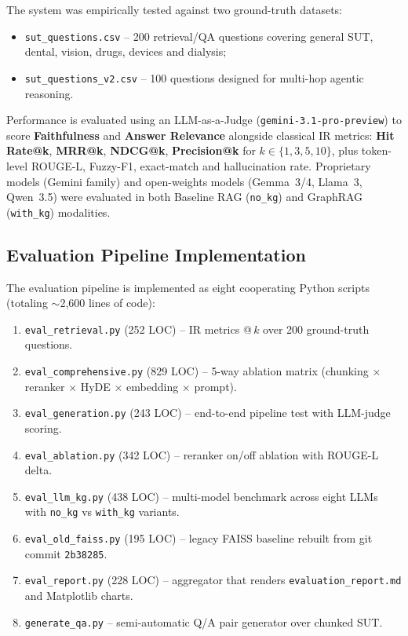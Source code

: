 \documentclass[11pt, a4paper]{article}
\begin{document}
The system was empirically tested against two ground-truth datasets:
\begin{itemize}[leftmargin=*]
    \item \texttt{sut\_questions.csv} -- 200 retrieval/QA questions covering general SUT, dental, vision, drugs, devices and dialysis;
    \item \texttt{sut\_questions\_v2.csv} -- 100 questions designed for multi-hop agentic reasoning.
\end{itemize}

Performance is evaluated using an LLM-as-a-Judge (\texttt{gemini-3.1-pro-preview}) to score \textbf{Faithfulness} and \textbf{Answer Relevance} alongside classical IR metrics: \textbf{Hit Rate@k}, \textbf{MRR@k}, \textbf{NDCG@k}, \textbf{Precision@k} for $k\!\in\!\{1,3,5,10\}$, plus token-level ROUGE-L, Fuzzy-F1, exact-match and hallucination rate. Proprietary models (Gemini family) and open-weights models (Gemma~3/4, Llama~3, Qwen~3.5) were evaluated in both Baseline RAG (\texttt{no\_kg}) and GraphRAG (\texttt{with\_kg}) modalities.

\subsection{Evaluation Pipeline Implementation}

The evaluation pipeline is implemented as eight cooperating Python scripts (totaling $\sim$2{,}600 lines of code):
\begin{enumerate}[leftmargin=*]
    \item \texttt{eval\_retrieval.py} (252 LOC) -- IR metrics @\,$k$ over 200 ground-truth questions.
    \item \texttt{eval\_comprehensive.py} (829 LOC) -- 5-way ablation matrix (chunking $\times$ reranker $\times$ HyDE $\times$ embedding $\times$ prompt).
    \item \texttt{eval\_generation.py} (243 LOC) -- end-to-end pipeline test with LLM-judge scoring.
    \item \texttt{eval\_ablation.py} (342 LOC) -- reranker on/off ablation with ROUGE-L delta.
    \item \texttt{eval\_llm\_kg.py} (438 LOC) -- multi-model benchmark across eight LLMs with \texttt{no\_kg} vs \texttt{with\_kg} variants.
    \item \texttt{eval\_old\_faiss.py} (195 LOC) -- legacy FAISS baseline rebuilt from git commit \texttt{2b38285}.
    \item \texttt{eval\_report.py} (228 LOC) -- aggregator that renders \texttt{evaluation\_report.md} and Matplotlib charts.
    \item \texttt{generate\_qa.py} -- semi-automatic Q/A pair generator over chunked SUT.
\end{enumerate}
\end{document}
